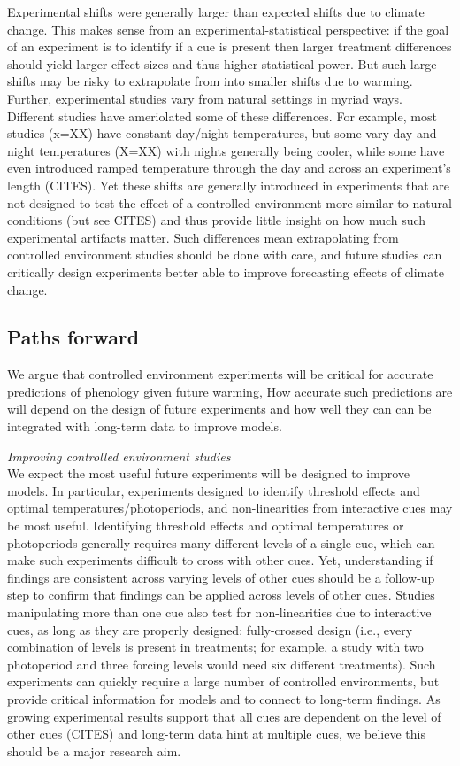 \documentclass[11pt,letter]{article}
\begin{document}
Experimental shifts were generally larger than expected shifts due to climate change. This makes sense from an experimental-statistical perspective: if the goal of an experiment is to identify if a cue is present then larger treatment differences should yield larger effect sizes and thus higher statistical power. But such large shifts may be risky to extrapolate from into smaller shifts due to warming. Further, experimental studies vary from natural settings in myriad ways. Different studies have ameriolated some of these differences. For example, most studies (x=XX) have constant day/night temperatures, but some vary day and night temperatures (X=XX) with nights generally being cooler, while some have even introduced ramped temperature through the day and across an experiment's length (CITES). Yet these shifts are generally introduced in experiments that are not designed to test the effect of a controlled environment more similar to natural conditions (but see CITES) and thus provide little insight on how much such experimental artifacts matter. Such differences mean extrapolating from controlled environment studies should be done with care, and future studies can critically design experiments better able to improve forecasting effects of climate change. 

\subsection{Paths forward}
We argue that controlled environment experiments will be critical for accurate predictions of phenology given future warming, How accurate such predictions are will depend on the design of future experiments and how well they can can be integrated with long-term data to improve models. 

\emph{Improving controlled environment studies}\\
We expect the most useful future experiments will be designed to improve models. In particular, experiments designed to identify threshold effects and optimal temperatures/photoperiods, and non-linearities from interactive cues may be most useful. Identifying threshold effects and optimal temperatures or photoperiods generally requires many different levels of a single cue, which can make such experiments difficult to cross with other cues. Yet, understanding if findings are consistent across varying levels of other cues should be a follow-up step to confirm that findings can be applied across levels of other cues. Studies manipulating more than one cue also test for non-linearities due to interactive cues, as long as they are properly designed: fully-crossed design (i.e., every combination of levels is present in treatments; for example, a study with two photoperiod and three forcing levels would need six different treatments). Such experiments can quickly require a large number of controlled environments, but provide critical information for models and to connect to long-term findings. As growing experimental results support that all cues are dependent on the level of other cues (CITES) and long-term data hint at multiple cues, we believe this should be a major research aim.
\end{document}
